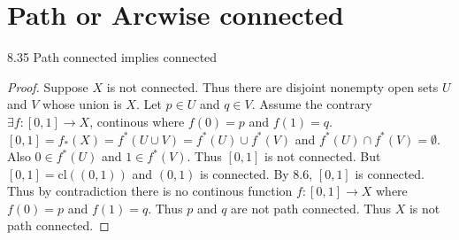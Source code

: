 \documentclass{article}
\newcommand*{\cl}{\mathrm{cl}}
\newcommand*{\empset}{\emptyset}
\begin{document}
\pagebreak

\section{Path or Arcwise connected}

\begin{claim}{8.35}\label{Claim 8.35.}
    Path connected implies connected
\end{claim}
\begin{proof}
    Suppose $X$ is not connected. Thus there are disjoint nonempty open sets $U$ and $V$ whose union is $X$. Let $p \in U$ and $q \in V$. Assume the contrary $\exists f : [0, 1] \to X$, continous where $f(0) = p$ and $f(1) = q$. $[0, 1] = f_*(X) = f^*(U \cup V) = f^*(U) \cup f^*(V)$ and $f^*(U) \cap f^*(V) = \empset$. Also $0 \in f^*(U)$ and $1 \in f^*(V)$. Thus $[0, 1]$ is not connected. But $[0, 1] = \cl((0, 1))$ and $(0, 1)$ is connected. By 8.6, $[0, 1]$ is connected. Thus by contradiction there is no continous function $f: [0, 1] \to X$ where $f(0) = p$ and $f(1) = q$. Thus $p$ and $q$ are not path connected. Thus $X$ is not path connected.       
\end{proof}

\bigskip
\end{document}
